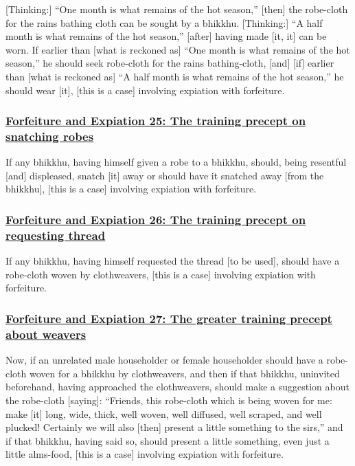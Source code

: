 [Thinking:] ``One month is what remains of the hot season,'' [then] the robe-cloth for the rains bathing cloth can be sought by a bhikkhu. [Thinking:] ``A half month is what remains of the hot season,'' [after] having made [it, it] can be worn. If earlier than [what is reckoned as] ``One month is what remains of the hot season,'' he should seek robe-cloth for the rains bathing-cloth, [and] [if] earlier than [what is reckoned as] ``A half month is what remains of the hot season,'' he should wear [it], [this is a case] involving expiation with forfeiture.



\subsubsection*{\hyperref[np25]{Forfeiture and Expiation 25: The training precept on snatching robes}}
\label{forf-exp25}

If any bhikkhu, having himself given a robe to a bhikkhu, should, being resentful [and] displeased, snatch [it] away or should have it snatched away [from the bhikkhu], [this is a case] involving expiation with forfeiture.



\subsubsection*{\hyperref[np26]{Forfeiture and Expiation 26: The training precept on requesting thread}}
\label{forf-exp26}

If any bhikkhu, having himself requested the thread [to be used], should have a robe-cloth woven by clothweavers, [this is a case] involving expiation with forfeiture.



\subsubsection*{\hyperref[np27]{Forfeiture and Expiation 27: The greater training precept about weavers}}
\label{forf-exp27}

Now, if an unrelated male householder or female householder should have a robe-cloth woven for a bhikkhu by clothweavers, and then if that bhikkhu, uninvited beforehand, having approached the clothweavers, should make a suggestion about the robe-cloth [saying]: ``Friends, this robe-cloth which is being woven for me: make [it] long, wide, thick, well woven, well diffused, well scraped, and well plucked! Certainly we will also [then] present a little something to the sirs,'' and if that bhikkhu, having said so, should present a little something, even just a little alms-food, [this is a case] involving expiation with forfeiture.



